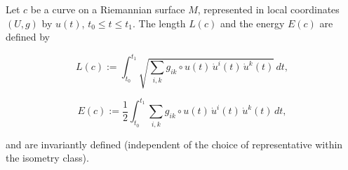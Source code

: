 Let $c$ be a curve on a Riemannian surface $M$, represented in local coordinates $(U, g)$ by $u(t)$, $t_0 \leq t \leq t_1$. The length $L(c)$ and the energy $E(c)$ are defined by

$$L(c) := \int_{t_0}^{t_1} \sqrt{\sum_{i,k} g_{ik} \circ u(t) \, \dot{u}^i(t) \, \dot{u}^k(t)} \, dt,$$

$$E(c) := \frac{1}{2} \int_{t_0}^{t_1} \sum_{i,k} g_{ik} \circ u(t) \, \dot{u}^i(t) \, \dot{u}^k(t) \, dt,$$

and are invariantly defined (independent of the choice of representative within the isometry class).
